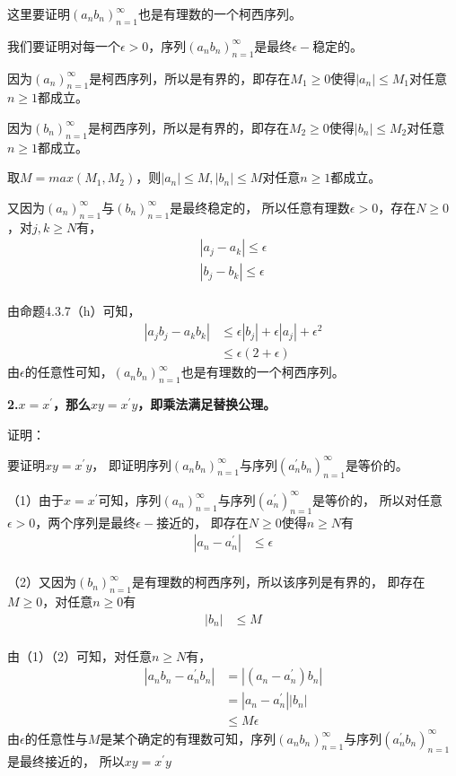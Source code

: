 \documentclass{article}
\theoremstyle{mystyle}
\begin{document}
这里要证明$(a_nb_n)_{n=1}^\infty$也是有理数的一个柯西序列。

我们要证明对每一个$\epsilon > 0$，序列$(a_nb_n)_{n=1}^\infty$是最终$\epsilon-$稳定的。

因为$(a_n)_{n=1}^\infty$是柯西序列，所以是有界的，即存在$M_1 \ge 0$使得$|a_n|\leq M_1$对任意$n \geq 1$都成立。

因为$(b_n)_{n=1}^\infty$是柯西序列，所以是有界的，即存在$M_2 \ge 0$使得$|b_n|\leq M_2$对任意$n \geq 1$都成立。

取$M=max(M_1,M_2)$，则$|a_n|\leq M, |b_n| \leq M$对任意$n \geq 1$都成立。

又因为$(a_n)_{n=1}^\infty$与$(b_n)_{n=1}^\infty$是最终稳定的，
所以任意有理数$\epsilon>0$，存在$N \geq 0$，对$j,k \geq N$有，
\begin{align*}
  |a_j - a_k| \leq \epsilon \\
  |b_j - b_k| \leq \epsilon \\
\end{align*}

由命题4.3.7（h）可知，
\begin{align*}
  |a_jb_j - a_kb_k| & \leq \epsilon|b_j| + \epsilon|a_j| + \epsilon^2 \\
                    & \leq \epsilon (2 + \epsilon)
\end{align*}
由$\epsilon$的任意性可知，$(a_nb_n)_{n=1}^\infty$也是有理数的一个柯西序列。

\textbf{2.$x=x^\prime$，那么$xy = x^\prime y$，即乘法满足替换公理。}

证明：

要证明$xy = x^\prime y$，
即证明序列$(a_nb_n)_{n=1}^\infty$与序列$(a^\prime_nb_n)_{n=1}^\infty$是等价的。

（1）由于$x=x^\prime$可知，序列$(a_n)_{n=1}^\infty$与序列$(a^\prime_n)_{n=1}^\infty$是等价的，
所以对任意$\epsilon > 0$，两个序列是最终$\epsilon -$接近的，
即存在$N \geq 0$使得$n \geq N$有
\begin{align*}
  |a_n - a^\prime_n| & \leq \epsilon \\
\end{align*}

（2）又因为$(b_n)_{n=1}^\infty$是有理数的柯西序列，所以该序列是有界的，
即存在$M \geq 0$，对任意$n \geq 0$有
\begin{align*}
  |b_n| & \leq M \\
\end{align*}

由（1）（2）可知，对任意$n \geq N$有，
\begin{align*}
  |a_nb_n - a^\prime_nb_n| & = |(a_n-a^\prime_n)b_n| \\
                           & = |a_n-a^\prime_n||b_n| \\
                           & \leq M \epsilon
\end{align*}
由$\epsilon$的任意性与$M$是某个确定的有理数可知，序列$(a_nb_n)_{n=1}^\infty$与序列$(a^\prime_nb_n)_{n=1}^\infty$是最终接近的，
所以$xy = x^\prime y$
\end{document}
